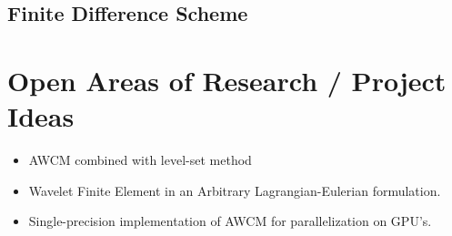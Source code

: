 \documentclass[11pt]{article}
\begin{document}
\subsection{Finite Difference Scheme}

\section{Open Areas of Research / Project Ideas}
\begin{itemize}
	\item AWCM combined with level-set method 
	\item Wavelet Finite Element in an Arbitrary Lagrangian-Eulerian formulation.
	\item Single-precision implementation of AWCM for parallelization on GPU's.
\end{itemize}
\end{document}
